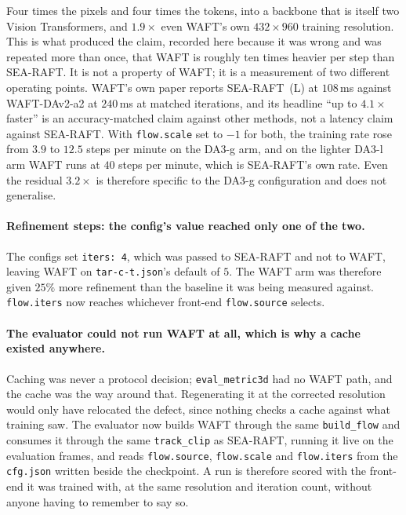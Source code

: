 \documentclass[11pt,a4paper]{article}
\begin{document}
Four times the pixels and four times the tokens, into a backbone that is itself two Vision
Transformers, and $1.9\times$ even WAFT's own $432 \times 960$ training resolution. This is what
produced the claim, recorded here because it was wrong and was repeated more than once, that WAFT is
roughly ten times heavier per step than SEA-RAFT. It is not a property of WAFT; it is a measurement
of two different operating points. WAFT's own paper reports SEA-RAFT~(L) at $108$\,ms against
WAFT-DAv2-a2 at $240$\,ms at matched iterations, and its headline ``up to $4.1\times$ faster'' is an
accuracy-matched claim against other methods, not a latency claim against SEA-RAFT. With
\texttt{flow.scale} set to $-1$ for both, the training rate rose from $3.9$ to $12.5$ steps per
minute on the DA3-g arm, and on the lighter DA3-l arm WAFT runs at $40$ steps per minute, which is
SEA-RAFT's own rate. Even the residual $3.2\times$ is therefore specific to the DA3-g
configuration and does not generalise.

\paragraph{Refinement steps: the config's value reached only one of the two.} The configs set
\texttt{iters: 4}, which was passed to SEA-RAFT and not to WAFT, leaving WAFT on
\texttt{tar-c-t.json}'s default of $5$. The WAFT arm was therefore given $25\%$ more refinement than
the baseline it was being measured against. \texttt{flow.iters} now reaches whichever front-end
\texttt{flow.source} selects.

\paragraph{The evaluator could not run WAFT at all, which is why a cache existed anywhere.} Caching
was never a protocol decision; \texttt{eval\_metric3d} had no WAFT path, and the cache was the way
around that. Regenerating it at the corrected resolution would only have relocated the defect, since
nothing checks a cache against what training saw. The evaluator now builds WAFT through the same
\texttt{build\_flow} and consumes it through the same \texttt{track\_clip} as SEA-RAFT, running it
live on the evaluation frames, and reads \texttt{flow.source}, \texttt{flow.scale} and
\texttt{flow.iters} from the \texttt{cfg.json} written beside the checkpoint. A run is therefore
scored with the front-end it was trained with, at the same resolution and iteration count, without
anyone having to remember to say so.
\end{document}
